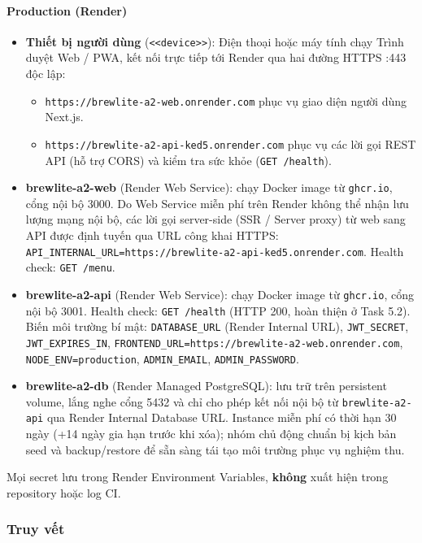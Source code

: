 \paragraph{Production (Render)}
\begin{itemize}
  \item \textbf{Thiết bị người dùng} (\texttt{<<device>>}): Điện thoại hoặc máy tính chạy Trình duyệt Web / PWA, kết nối trực tiếp tới Render qua hai đường HTTPS :443 độc lập:
    \begin{itemize}
      \item \texttt{https://brewlite-a2-web.onrender.com} phục vụ giao diện người dùng Next.js.
      \item \texttt{https://brewlite-a2-api-ked5.onrender.com} phục vụ các lời gọi REST API (hỗ trợ CORS) và kiểm tra sức khỏe (\texttt{GET /health}).
    \end{itemize}
  \item \textbf{brewlite-a2-web} (Render Web Service): chạy Docker image từ \texttt{ghcr.io}, cổng nội bộ 3000.
    Do Web Service miễn phí trên Render không thể nhận lưu lượng mạng nội bộ, các lời gọi server-side (SSR / Server proxy) từ web sang API được định tuyến qua URL công khai HTTPS: \texttt{API\_INTERNAL\_URL=https://brewlite-a2-api-ked5.onrender.com}.
    Health check: \texttt{GET /menu}.
  \item \textbf{brewlite-a2-api} (Render Web Service): chạy Docker image từ \texttt{ghcr.io}, cổng nội bộ 3001.
    Health check: \texttt{GET /health} (HTTP 200, hoàn thiện ở Task 5.2).
    Biến môi trường bí mật: \texttt{DATABASE\_URL} (Render Internal URL), \texttt{JWT\_SECRET}, \texttt{JWT\_EXPIRES\_IN}, \texttt{FRONTEND\_URL=https://brewlite-a2-web.onrender.com}, \texttt{NODE\_ENV=production}, \texttt{ADMIN\_EMAIL}, \texttt{ADMIN\_PASSWORD}.
  \item \textbf{brewlite-a2-db} (Render Managed PostgreSQL): lưu trữ trên persistent volume, lắng nghe cổng 5432 và chỉ cho phép kết nối nội bộ từ \texttt{brewlite-a2-api} qua Render Internal Database URL. Instance miễn phí có thời hạn 30 ngày (+14 ngày gia hạn trước khi xóa); nhóm chủ động chuẩn bị kịch bản seed và backup/restore để sẵn sàng tái tạo môi trường phục vụ nghiệm thu.
\end{itemize}

Mọi secret lưu trong Render Environment Variables, \textbf{không} xuất hiện trong repository hoặc log CI.

\subsubsection{Truy vết}

